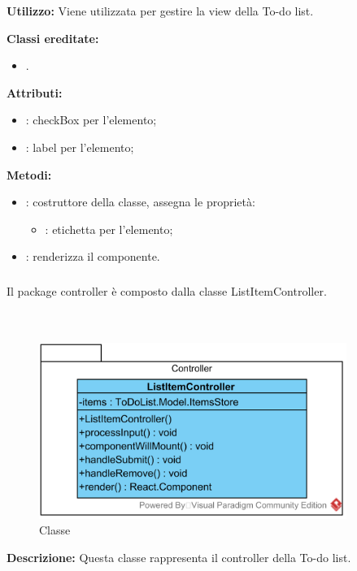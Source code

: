 \textbf{Utilizzo:}
Viene utilizzata per gestire la view della To-do list.

\textbf{Classi ereditate:}
\begin{itemize}
	\item {}.
\end{itemize}

\textbf{Attributi:}
\begin{itemize}
	\item {}: checkBox per l'elemento;
	\item {}: label per l'elemento; 
\end{itemize}

\textbf{Metodi:}
\begin{itemize}
	\item {}: costruttore della classe, assegna le proprietà:
	\begin{itemize}
		\item {}: etichetta per l'elemento;
	\end{itemize}
	\item {}: renderizza il componente.
\end{itemize}

\subsubsection[::Controller]{\class} \label{\class}
Il package controller è composto dalla classe ListItemController.


\paragraph[::ListItemController]{\class}\mbox{}\\ \label{\class}
\begin{figure}[H]
	\centering
	\includegraphics[width=10cm]{./diagrammi/todo/todocontroller.png}
	\caption{Classe \class}
\end{figure}
\textbf{Descrizione:}
Questa classe rappresenta il controller della To-do list.

